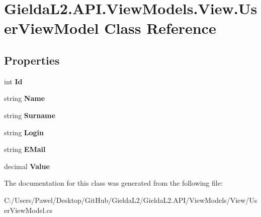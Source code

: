 \hypertarget{class_gielda_l2_1_1_a_p_i_1_1_view_models_1_1_view_1_1_user_view_model}{}\section{Gielda\+L2.\+A\+P\+I.\+View\+Models.\+View.\+User\+View\+Model Class Reference}
\label{class_gielda_l2_1_1_a_p_i_1_1_view_models_1_1_view_1_1_user_view_model}
\subsection*{Properties}
\begin{DoxyCompactItemize}
\item 
\mbox{\label{class_gielda_l2_1_1_a_p_i_1_1_view_models_1_1_view_1_1_user_view_model_a31ab3916648df63159a65bbfd63436f3}} 
int {\bfseries Id}
\item 
\mbox{\label{class_gielda_l2_1_1_a_p_i_1_1_view_models_1_1_view_1_1_user_view_model_a358c1d7c59c3eefe8223559f6e309d7e}} 
string {\bfseries Name}
\item 
\mbox{\label{class_gielda_l2_1_1_a_p_i_1_1_view_models_1_1_view_1_1_user_view_model_aa4707e21d78bd91e1e4c8383bcf9e9f4}} 
string {\bfseries Surname}
\item 
\mbox{\label{class_gielda_l2_1_1_a_p_i_1_1_view_models_1_1_view_1_1_user_view_model_a3053154cb490c1b7d4e74c533242f5eb}} 
string {\bfseries Login}
\item 
\mbox{\label{class_gielda_l2_1_1_a_p_i_1_1_view_models_1_1_view_1_1_user_view_model_a01d9db3d4355dfe0b1eecb8664268f1c}} 
string {\bfseries E\+Mail}
\item 
\mbox{\label{class_gielda_l2_1_1_a_p_i_1_1_view_models_1_1_view_1_1_user_view_model_a0ef8f70d74d0cff1ab5c7f5e7c663c79}} 
decimal {\bfseries Value}
\end{DoxyCompactItemize}


The documentation for this class was generated from the following file\+:\begin{DoxyCompactItemize}
\item 
C\+:/\+Users/\+Pawel/\+Desktop/\+Git\+Hub/\+Gielda\+L2/\+Gielda\+L2.\+A\+P\+I/\+View\+Models/\+View/User\+View\+Model.\+cs\end{DoxyCompactItemize}
